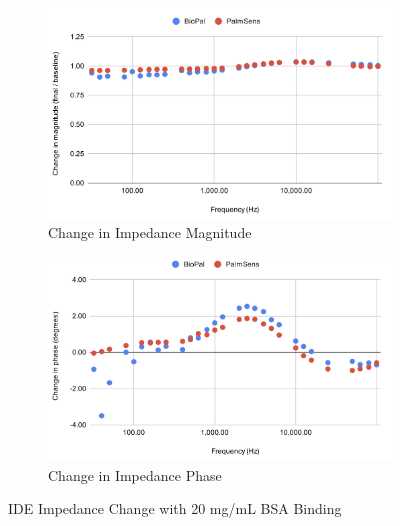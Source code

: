 \begin{figure}[H]
    \centering
    \begin{subfigure}{0.48\textwidth}
        \includegraphics[width=\textwidth]{2g:100mL mag.png}
        \caption{Change in Impedance Magnitude}
        \label{fig:2g_mag}
    \end{subfigure}
    \hfill
    \begin{subfigure}{0.48\textwidth}
        \includegraphics[width=\textwidth]{2g:100mL phase.png}
        \caption{Change in Impedance Phase}
        \label{fig:2g_phase}
    \end{subfigure}
    \caption{IDE Impedance Change with 20 mg/mL BSA Binding}
    \label{fig:2g_bsa_comparison}
\end{figure}

